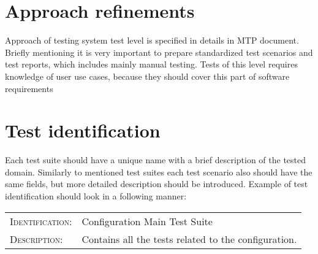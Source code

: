 \section{Approach refinements} \label{s:details-of-the-level-test-design:approach-refinements}
	\begin{comment}
		Specify refinements to the approach described in the corresponding Level Test Plan (if there is one;
		otherwise specify the entire approach). Include specific test techniques to be used. The method of
		analyzing test results should be identified (e.g., comparator tools, visual inspection, etc.).
		Summarize the common attributes of any test cases. This may include input constraints that must be
		true for every input in a set of associated test cases, any shared environmental needs, any shared
		special procedural requirements, and any shared case dependencies. Sets of associated test cases may
		be identified as scenarios (also commonly called scripts or suites). Test scenarios should be designed to
		be as reusable as possible for regression testing, revalidation testing for changes, and training new
		employees who must either use or support the system over time.
	\end{comment}
	Approach of testing system test level is specified in details in \gls{MTP} document. Briefly mentioning it is very important to prepare standardized test scenarios and test reports, which includes mainly manual testing. Tests of this level requires knowledge of user use cases, because they should cover this part of software requirements
\section{Test identification} \label{s:details-of-the-level-test-design:test-identification}
	\begin{comment}
		List the identifier and a brief description of each test case (or set of related test cases) in scenarios for
		this design. A particular test case, scenario, or procedure may be identified in more than one LTD. List
		the identifier and a brief description of each procedure associated with this LTD.
	\end{comment}
	Each test suite should have a unique name with a brief description of the tested domain. Similarly to mentioned test suites each test scenario also should have the same fields, but more detailed description should be introduced. Example of test identification should look in a following manner: \\
	\begin{center}
		\boxed
		{
			\begin{tabular}{ll}
				 \textsc{Identification:} & Configuration Main Test Suite \\
				 \textsc{Description:} & Contains all the tests related to the configuration.
			\end{tabular}
		}
	\end{center}
	

